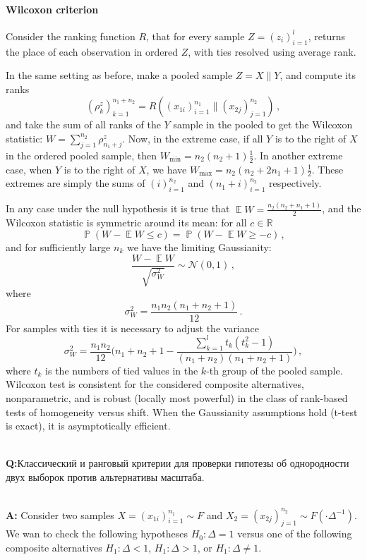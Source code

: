 \documentclass[a4paper]{article}
\newcommand{\Ncal}{\mathcal{N}}
\newcommand{\ex}{\mathop{\mathbb{E}}\nolimits}
\newcommand{\pr}{\mathop{\mathbb{P}}\nolimits}
\newcommand{\rus}[1]{\foreignlanguage{russian}{#1}}
\begin{document}
\paragraph{Wilcoxon criterion} %
\label{par:wilcoxon_criterion}
Consider the ranking function $R$, that for every sample $Z=(z_i)_{i=1}^l$, returns
the place of each observation in ordered $Z$, with ties resolved using average rank.

In the same setting as before, make a pooled sample $Z = X \| Y$, and compute its
ranks
$$ (\rho^z_k)_{k=1}^{n_1+n_2} = R((x_{1i})_{i=1}^{n_1}\|(x_{2j})_{j=1}^{n_2}) \,, $$
and take the sum of all ranks of the $Y$ sample in the pooled to get the Wilcoxon
statistic: $ W = \sum_{j=1}^{n_2} \rho^z_{n_1+j} $. Now, in the extreme case, if
all $Y$ is to the right of $X$ in the ordered pooled sample, then $W_{\text{min}}
= n_2 (n_2+1)\frac{1}{2}$. In another extreme case, when $Y$ is to the right of $X$,
we have $W_{\text{max}} = n_2(n_2 + 2n_1 + 1) \frac{1}{2}$. These extremes are simply
the sums of $(i)_{i=1}^{n_2}$ and $(n_1+i)_{i=1}^{n_2}$ respectively.

In any case under the null hypothesis it is true that $ \ex W = \frac{n_2 (n_2 + n_1 + 1)}{2}$,
and the Wilcoxon statistic is symmetric around its mean: for all $c\in \mathbb{R}$
$$ \pr(W - \ex W \leq c) = \pr(W - \ex W \geq -c) \,, $$
and for sufficiently large $n_k$ we have the limiting Gaussianity:
$$ \frac{W - \ex W}{\sqrt{\sigma^2_W}} \sim \Ncal(0, 1) \,, $$
where 
$$ \sigma^2_W = \frac{n_1 n_2 (n_1+n_2+1)}{12} \,. $$
For samples with ties it is necessary to adjust the variance
$$ \sigma^2_W
    = \frac{n_1 n_2}{12} \biggl(n_1+n_2+1
        -\frac{\sum_{k=1}^l t_k(t_k^2-1)}{(n_1+n_2)(n_1+n_2+1)}
    \biggr) \,, $$
where $t_k$ is the numbers of tied values in the $k$-th group of the pooled sample.
Wilcoxon test is consistent for the considered composite alternatives, nonparametric,
and is robust (locally most powerful) in the class of rank-based tests of homogeneity
versus shift. When the Gaussianity assumptions hold (t-test is exact), it is asymptotically
efficient.


\hfill\\\noindent\textbf{Q:}\rus{Классический и ранговый критерии для проверки гипотезы
об однородности двух выборок против альтернативы масштаба.}

\hfill\\\noindent\textbf{A:}
Consider two samples $X=(x_{1i})_{i=1}^{n_1}\sim F$ and $X_2=(x_{2j})_{j=1}^{n_2}
\sim F(\cdot\Delta^{-1})$. We wan to check the following hypotheses $H_0: \Delta=1$
versus one of the following composite alternatives $H_1: \Delta < 1$, $H_1: \Delta > 1$,
or $H_1: \Delta \neq 1$.
\end{document}
